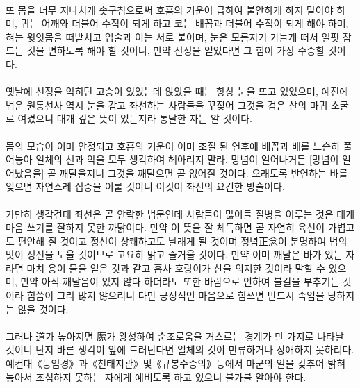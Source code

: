 \documentclass[12pt, a4paper, oneside]{book}
\begin{document}
\paragraph{}
또 몸을 너무 지나치게 솟구침으로써 
호흡의 기운이 급하여 불안하게 하지 말아야 하며, 
귀는 어깨와 더불어 수직이 되게 하고 
코는 배꼽과 더불어 수직이 되게 해야 하며, 
혀는 윗잇몸을 떠받치고 입술과 이는 서로 붙이며, 
눈은 모름지기 가늘게 떠서 
얼핏 잠드는 것을 면하도록 해야 할 것이니, 
만약 선정을 얻었다면 그 힘이 가장 수승할 것이다.

\paragraph{}
옛날에 선정을 익히던 고승이 있었는데 
앉았을 때는 항상 눈을 뜨고 있었으며,
예전에 법운 원통선사 역시 눈을 감고 좌선하는 사람들을 꾸짖어 
그것을 검은 산의 마귀 소굴로 여겼으니
대개 깊은 뜻이 있는지라 통달한 자는 알 것이다.

\paragraph{}
몸의 모습이 이미 안정되고 호흡의 기운이 이미 조절 된 연후에 
배꼽과 배를 느슨히 풀어놓아 
일체의 선과 악을 모두 생각하여 헤아리지 말라. 
망념이 일어나거든 [망념이 일어났음을] 곧 깨달을지니 
그것을 깨달으면 곧 없어질 것이다. 
오래도록 반연하는 바를 잊으면 자연스레 집중을 이룰 것이니 
이것이 좌선의 요긴한 방술이다.

\paragraph{}
가만히 생각건대 좌선은 곧 안락한 법문인데 
사람들이 많이들 질병을 이루는 것은
대개 마음 쓰기를 잘하지 못한 까닭이다. 
만약 이 뜻을 잘 체득하면 곧 자연히 육신이 가볍고도 
편안해 질 것이고 정신이 상쾌하고도 날래게 될 것이며
정념正念이 분명하여 법의 맛이 정신을 도울 것이므로 
고요히 맑고 즐거울 것이다. 
만약 이미 깨달은 바가 있는 자라면 마치 
용이 물을 얻은 것과 같고 
흡사 호랑이가 산을 의지한 것이라 말할 수 있으며, 
만약 아직 깨달음이 있지 않다 하더라도 또한 바람으로 인하여 
불길을 부추기는 것이라 힘씀이 그리 많지 않으리니
다만 긍정적인 마음으로 힘쓰면 반드시 속임을 당하지는 않을 것이다.

\paragraph{}
그러나 道가 높아지면 魔가 왕성하여 
순조로움을 거스르는 경계가 만 가지로 나타날 것이니 
단지 바른 생각이 앞에 드러난다면 
일체의 것이 만류하거나 장애하지 못하리다. 
예컨대《능엄경》과《천태지관》및《규봉수증의》등에서 
마군의 일을 갖추어 밝혀 놓아서 조심하지 못하는 자에게 
예비토록 하고 있으니 불가불 알아야 한다.
\end{document}
